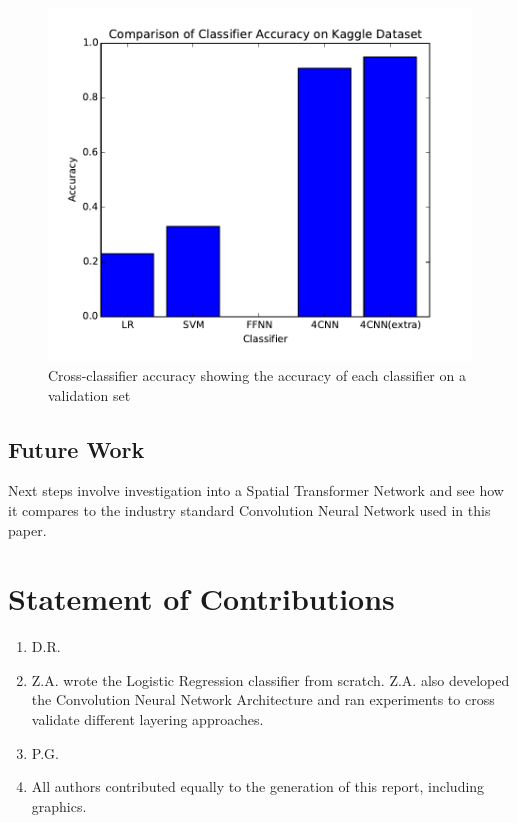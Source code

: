 \documentclass[conference]{IEEEtran}
\begin{document}
\begin{figure}[h]
	\centering
	\includegraphics[scale=0.6]{cross-classifier-acc.pdf}
	\caption{Cross-classifier accuracy showing the accuracy of each classifier on a validation set}
	\label{crossacc}
\end{figure}


\subsection{Future Work}
Next steps involve investigation into a Spatial Transformer Network \cite{STN} and see how it compares to the industry standard Convolution Neural Network used in this paper.


\section{Statement of Contributions}

\begin{enumerate}
\item D.R.
\item Z.A. wrote the Logistic Regression classifier from scratch. Z.A. also developed the Convolution Neural Network Architecture and ran experiments to cross validate different layering approaches.
\item P.G.
\item All authors contributed equally to the generation of this report, including graphics.
\end{enumerate}
\end{document}
